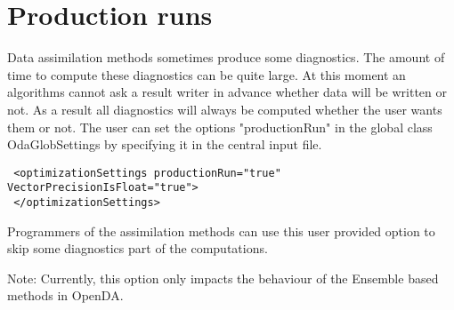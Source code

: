 \documentclass[12pt]{article}
\begin{document}
\section{Production runs}
Data assimilation methods sometimes produce some diagnostics. The amount of time to compute these diagnostics can be quite large. At this moment an algorithms cannot ask a result writer in advance whether data will be written or not. As a result all diagnostics will always be computed whether the user wants them or not. The user can set the options "productionRun" in the global class OdaGlobSettings by specifying it in the central input file.

{\footnotesize
\begin{verbatim}
 <optimizationSettings productionRun="true" VectorPrecisionIsFloat="true">
 </optimizationSettings>
\end{verbatim}}  
Programmers of the assimilation methods can use this user provided option to skip some diagnostics part of the computations.

Note: Currently, this option only impacts the behaviour of the Ensemble based methods in OpenDA.
 
\end{document}
